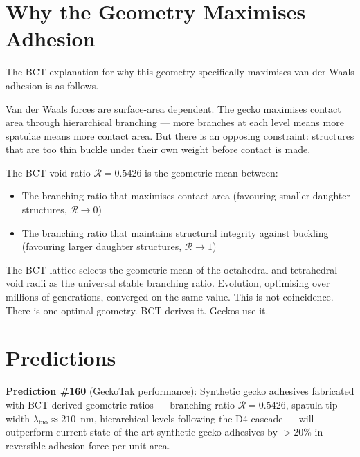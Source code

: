 \documentclass[12pt,twocolumn]{article}
\begin{document}
\section{Why the Geometry Maximises Adhesion}

The BCT explanation for why this geometry specifically maximises
van der Waals adhesion is as follows.

Van der Waals forces are surface-area dependent. The gecko
maximises contact area through hierarchical branching ---
more branches at each level means more spatulae means more
contact area. But there is an opposing constraint: structures
that are too thin buckle under their own weight before
contact is made.

The BCT void ratio $\mathcal{R} = 0.5426$ is the geometric
mean between:
\begin{itemize}\setlength\itemsep{2pt}
  \item The branching ratio that maximises contact area
        (favouring smaller daughter structures, $\mathcal{R}
        \to 0$)
  \item The branching ratio that maintains structural integrity
        against buckling (favouring larger daughter structures,
        $\mathcal{R} \to 1$)
\end{itemize}

The BCT lattice selects the geometric mean of the octahedral
and tetrahedral void radii as the universal stable branching
ratio. Evolution, optimising over millions of generations,
converged on the same value. This is not coincidence. There
is one optimal geometry. BCT derives it. Geckos use it.

\section{Predictions}

\noindent\textbf{Prediction \#160} (GeckoTak performance):
Synthetic gecko adhesives fabricated with BCT-derived geometric
ratios --- branching ratio $\mathcal{R} = 0.5426$, spatula
tip width $\lambda_{\mathrm{bio}} \approx 210$~nm, hierarchical
levels following the D4 cascade --- will outperform current
state-of-the-art synthetic gecko adhesives by $>20\%$ in
reversible adhesion force per unit area.
\end{document}
